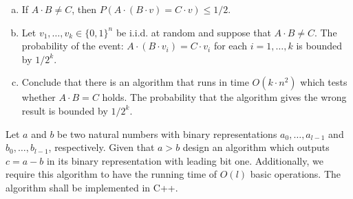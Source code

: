 \documentclass[11pt]{article}
\begin{document}
\begin{enumerate}[a)]
\item If $A \cdot B \neq C$, then $P(A \cdot (B \cdot v) = C \cdot v) \leq 1/2$. 
\item Let $v_1,\dots,v_k \in \{0,1\}^n$ be i.i.d. at random and suppose that  $A \cdot B \neq C$. The probability of the event: $A \cdot (B \cdot v_i) = C \cdot v_i$ for each $i=1,\dots,k$ is bounded by $1/2^k$. 
\item Conclude that there is an algorithm that runs in time $O(k \cdot n^2)$ which tests whether $A \cdot B = C$ holds. The probability that the algorithm gives the wrong result is bounded by $1/2^k$. 
\end{enumerate}

\problemstar Let $a$ and $b$ be two natural numbers with binary representations 
   $a_0,\dots,a_{l-1}$ and $b_0,\dots,b_{l-1}$, respectively. Given that $a > b$ design an algorithm which outputs $c=a-b$ in its binary representation with leading bit one. Additionally,
   we require this algorithm to have the running time of $O(l)$ basic operations. The algorithm shall be implemented in C++.
\end{document}

